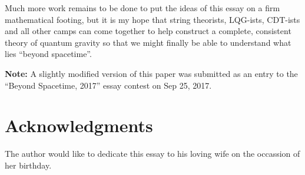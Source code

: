 \documentclass[a4paper]{article}
\begin{document}
Much more work remains to be done to put the ideas of this essay on a firm mathematical footing, but it is my hope that string theorists, LQG-ists, CDT-ists and all other camps can come together to help construct a complete, consistent theory of quantum gravity so that we might finally be able to understand what lies ``beyond spacetime''.

\textbf{Note:} A slightly modified version of this paper was submitted as an entry to the ``Beyond Spacetime, 2017'' essay contest on Sep 25, 2017.

\section*{Acknowledgments}

The author would like to dedicate this essay to his loving wife on the occassion of her birthday.

%

%


%


\end{document}
